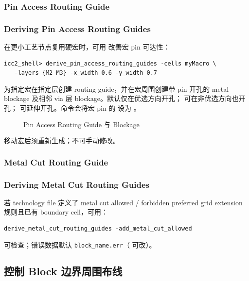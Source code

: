 \subsubsection{Pin Access Routing Guide}
\subsubsection*{Deriving Pin Access Routing Guides}

在更小工艺节点复用硬宏时，可用  改善宏 pin 可达性：

\begin{lstlisting}
icc2_shell> derive_pin_access_routing_guides -cells myMacro \
   -layers {M2 M3} -x_width 0.6 -y_width 0.7
\end{lstlisting}

为指定宏在指定层创建 routing guide，并在宏周围创建带 pin 开孔的 metal blockage 及相邻 via 层 blockage。默认仅在优选方向开孔； 可在非优选方向也开孔； 可延伸开孔。命令会将宏 pin 的  设为 。

\begin{figure}[htbp]
\centering
{}
\caption{Pin Access Routing Guide 与 Blockage}
\label{fig:pin-access-guides}
\end{figure}

移动宏后须重新生成；不可手动修改。

\subsubsection{Metal Cut Routing Guide}
\subsubsection*{Deriving Metal Cut Routing Guides}

若 technology file 定义了 metal cut allowed / forbidden preferred grid extension 规则且已有 boundary cell，可用：
\begin{lstlisting}
derive_metal_cut_routing_guides -add_metal_cut_allowed
\end{lstlisting}
 可检查；错误数据默认 \texttt{block\_name.err}（ 可改）。

\subsection{控制 Block 边界周围布线}
